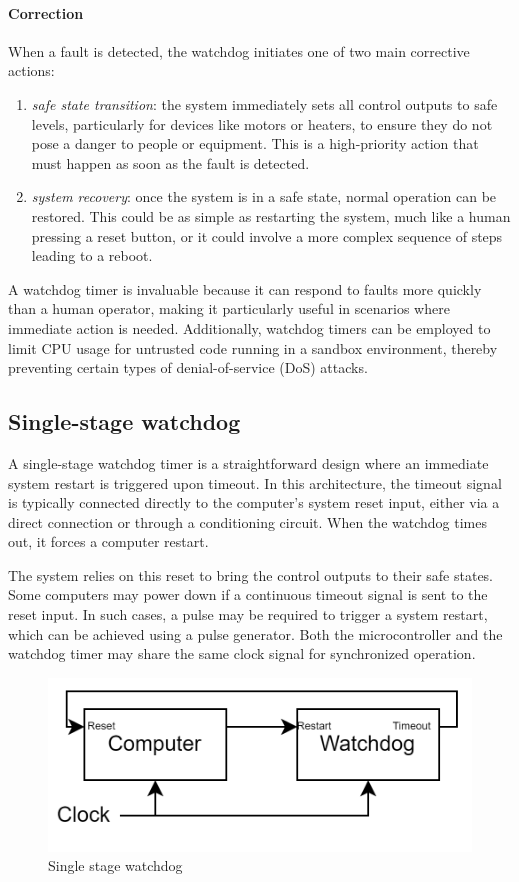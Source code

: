 \paragraph*{Correction}
When a fault is detected, the watchdog initiates one of two main corrective actions:
\begin{enumerate}
    \item \textit{safe state transition}: the system immediately sets all control outputs to safe levels, particularly for devices like motors or heaters, to ensure they do not pose a danger to people or equipment. 
        This is a high-priority action that must happen as soon as the fault is detected.
    \item \textit{system recovery}: once the system is in a safe state, normal operation can be restored. 
        This could be as simple as restarting the system, much like a human pressing a reset button, or it could involve a more complex sequence of steps leading to a reboot.
\end{enumerate}
A watchdog timer is invaluable because it can respond to faults more quickly than a human operator, making it particularly useful in scenarios where immediate action is needed. 
Additionally, watchdog timers can be employed to limit CPU usage for untrusted code running in a sandbox environment, thereby preventing certain types of denial-of-service (DoS) attacks.

\subsection{Single-stage watchdog}
A single-stage watchdog timer is a straightforward design where an immediate system restart is triggered upon timeout. 
In this architecture, the timeout signal is typically connected directly to the computer's system reset input, either via a direct connection or through a conditioning circuit.
When the watchdog times out, it forces a computer restart.

The system relies on this reset to bring the control outputs to their safe states.
Some computers may power down if a continuous timeout signal is sent to the reset input. 
In such cases, a pulse may be required to trigger a system restart, which can be achieved using a pulse generator.
Both the microcontroller and the watchdog timer may share the same clock signal for synchronized operation.
\begin{figure}[H]
    \centering
    \includegraphics[width=0.5\linewidth]{images/swdog.png}
    \caption{Single stage watchdog}
\end{figure}

